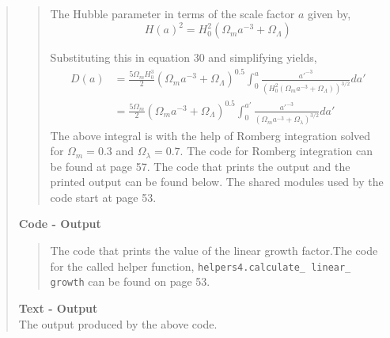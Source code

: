 \begin{quote}
\begin{quote}
The Hubble parameter in terms of the scale factor $a$ given by,
\begin{equation}
H(a)^2 = H_0^2 ( \Omega_m a^{-3} + \Omega_{\Lambda} )
\end{equation}

Substituting  this in equation 30 and simplifying yields,
\begin{align}
D(a) &= \frac{5 \Omega_m H_0^3}{2} ( \Omega_m a^{-3} + \Omega_{\Lambda} )^{0.5} \int_0^{a} \frac{a'^{-3}}{\left(H_0^2( \Omega_m a^{-3} + \Omega_{\Lambda} ) \right)^{3/2}} da' \\
&= \frac{5 \Omega_m}{2}  ( \Omega_m a^{-3} + \Omega_{\Lambda} )^{0.5} \int_0^{a'} \frac{a'^{-3}}{\left(\Omega_m a^{-3} + \Omega_{\lambda}\right)^{3/2}} da'
\label{EQ:Stuffffff}
\end{align}
The above integral is with the help of Romberg integration solved for $\Omega_{m} =0.3$ and $\Omega_{\lambda} = 0.7$.  The code for Romberg integration can be found at page 57.  The code that prints the output and the printed output can be found below. The shared modules used by the code start at page 53. %
\end{quote}

\textbf{Code - Output}
\begin{quote}
The code that prints the value of the linear growth factor.The code for the called helper function, \texttt{helpers4.calculate\_ linear\_ growth} can be found on page 53.

\end{quote}

\textbf{Text - Output} \\

The output produced by the above code.
\begin{quote}

\end{quote}

\end{quote}





